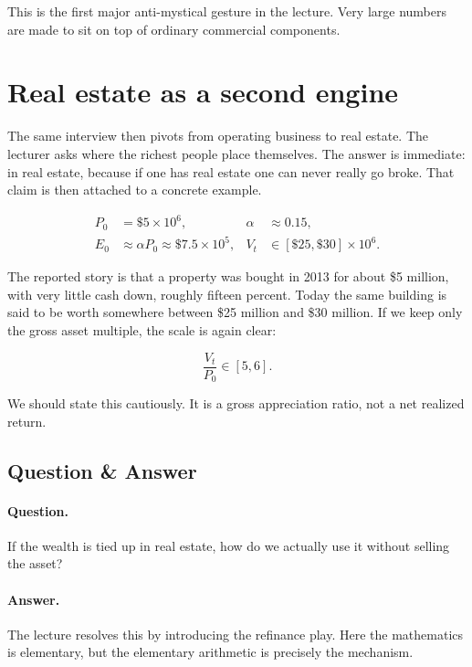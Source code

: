 This is the first major anti-mystical gesture in the lecture. Very large numbers are made to sit on top of ordinary commercial components.

\section{Real estate as a second engine}

The same interview then pivots from operating business to real estate. The lecturer asks where the richest people place themselves. The answer is immediate: in real estate, because if one has real estate one can never really go broke. That claim is then attached to a concrete example.

\begin{align}
P_0 &= \$5 \times 10^6, &
\alpha &\approx 0.15,\\
E_0 &\approx \alpha P_0 \approx \$7.5 \times 10^5, &
V_t &\in [\$25,\$30] \times 10^6.
\end{align}

The reported story is that a property was bought in 2013 for about \$5 million, with very little cash down, roughly fifteen percent. Today the same building is said to be worth somewhere between \$25 million and \$30 million. If we keep only the gross asset multiple, the scale is again clear:

\begin{equation}
\frac{V_t}{P_0} \in [5,6].
\end{equation}

We should state this cautiously. It is a gross appreciation ratio, not a net realized return.

\subsection{Question \& Answer}

\paragraph{Question.}
If the wealth is tied up in real estate, how do we actually use it without selling the asset?

\paragraph{Answer.}
The lecture resolves this by introducing the refinance play. Here the mathematics is elementary, but the elementary arithmetic is precisely the mechanism.

